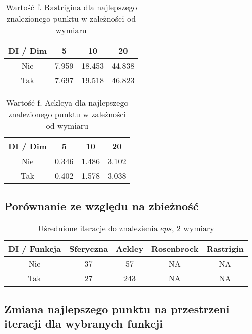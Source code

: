 \documentclass[12pt]{article}
\begin{document}
\begin{table}[ht]
	\centering
	\begin{tabular}{|c|c|c|c|}
		\hline
		DI / Dim & 5     & 10     & 20     \\
		\hline
		Nie      & 7.959 & 18.453 & 44.838 \\
		Tak      & 7.697 & 19.518 & 46.823 \\
		\hline
	\end{tabular}
	\caption{Wartość f. Rastrigina dla najlepszego znalezionego punktu w zależności od wymiaru}
	\label{tab:rastrigin_values}
\end{table}

\begin{table}[ht]
	\centering
	\begin{tabular}{|c|c|c|c|}
		\hline
		DI / Dim & 5     & 10    & 20    \\
		\hline
		Nie      & 0.346 & 1.486 & 3.102 \\
		Tak      & 0.402 & 1.578 & 3.038 \\
		\hline
	\end{tabular}
	\caption{Wartość f. Ackleya dla najlepszego znalezionego punktu w zależności od wymiaru}
	\label{tab:ackley_values}
\end{table}

\pagebreak
\subsection*{Porównanie ze względu na zbieżność}

\begin{table}[h]
	\centering
	\begin{tabular}{|c|c|c|c|c|}
		\hline
		DI / Funkcja & Sferyczna & Ackley & Rosenbrock & Rastrigin \\
		\hline
		Nie          & 37        & 57     & NA         & NA        \\
		Tak          & 27        & 243    & NA         & NA        \\
		\hline
	\end{tabular}
	\caption{Uśrednione iteracje do znalezienia $eps$, 2 wymiary}
	\label{convergence_table}
\end{table}

\FloatBarrier

\subsection*{Zmiana najlepszego punktu na przestrzeni iteracji dla wybranych funkcji}
\end{document}

